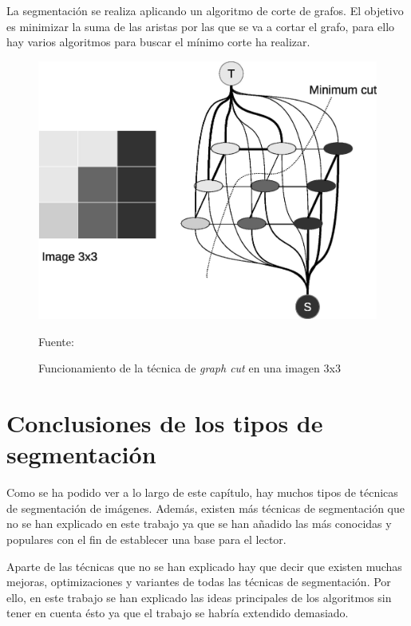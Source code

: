 La segmentaci\'{o}n se realiza aplicando un algoritmo de corte de grafos. El objetivo es minimizar la suma de las aristas por las que se va a cortar el grafo, para ello hay varios algoritmos para buscar el m\'{i}nimo corte ha realizar.

\begin{figure}[H]
	\captionsetup{justification=centering}
	\centering
	\includegraphics[width=.5\textwidth]{./imagenes/graphCuts1}
	\caption{Funcionamiento de la t\'{e}cnica de \textit{graph cut} en una imagen 3x3}
	\vspace{2 mm}		
	Fuente: \cite{eri2015}
	\label{graphCuts1}
\end{figure}

\section{Conclusiones de los tipos de segmentaci\'{o}n}\label{sec:conclusiones}

Como se ha podido ver a lo largo de este cap\'{i}tulo, hay muchos tipos de t\'{e}cnicas de segmentaci\'{o}n de im\'{a}genes. Adem\'{a}s, existen m\'{a}s t\'{e}cnicas de segmentaci\'{o}n que no se han explicado en este trabajo ya que se han a\~{n}adido las m\'{a}s conocidas y populares con el fin de establecer una base para el lector. 

Aparte de las t\'{e}cnicas que no se han explicado hay que decir que existen muchas mejoras, optimizaciones y variantes de todas las t\'{e}cnicas de segmentaci\'{o}n. Por ello, en este trabajo se han explicado las ideas principales de los algoritmos sin tener en cuenta \'{e}sto ya que el trabajo se habr\'{i}a extendido demasiado.